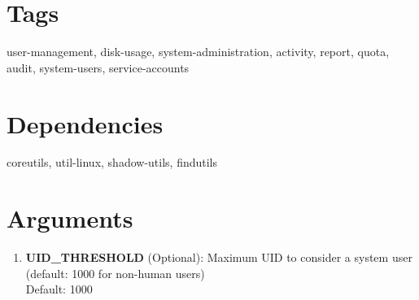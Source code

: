 \documentclass{article}
\begin{document}
\section*{Tags}
user-management, disk-usage, system-administration, activity, report, quota, audit, system-users, service-accounts

\section*{Dependencies}
coreutils, util-linux, shadow-utils, findutils


\section*{Arguments}
\begin{enumerate}
  \item \textbf{UID\_THRESHOLD} (Optional): Maximum UID to consider a system user (default: 1000 for non-human users) \\ Default: 1000
\end{enumerate}
\end{document}

